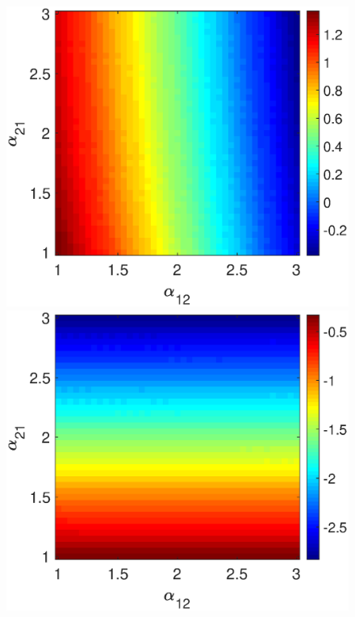 \begin{figure}[h]
  \begin{minipage}{0.32\linewidth}
  \begin{center}
\includegraphics[width=1\linewidth]{Images/photo20_1.eps}
\end{center}
  \end{minipage} 
  \begin{minipage}{0.32\linewidth}
  \begin{center}
\includegraphics[width=1\linewidth]{Images/photo20_2.eps}
\end{center}


\end{minipage}
\end{figure}
